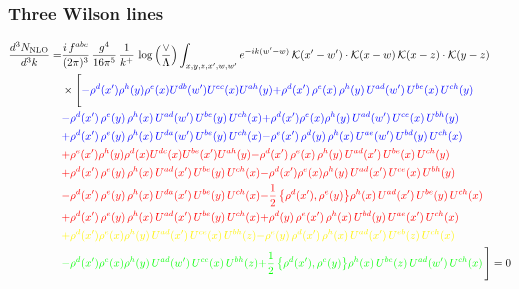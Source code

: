 \documentclass[9pt]{article}
\numberwithin{equation}{section}
\begin{document}
\subsubsection{Three Wilson lines}
\begin{align}
\frac{d^{3}N_{\rm NLO}}{d^{3}k}= &\frac{i\,f^{abc}}{(2\pi)^{3}}\,\frac{g^{4}}{16\pi^{5}}\,\frac{1}{k^{+}}\,\log\Big(\frac{\vee}{\Lambda}\Big)\int_{x,y,z,x',w,w'}e^{-ik(w'-w)}\,\mathcal{K}(x'-w')\cdot\mathcal{K}(x-w)\,\mathcal{K}(x-z)\cdot\mathcal{K}(y-z)\notag\\
&\times\Bigg[{\color{blue}-\rho^{d}(x') \rho^{h}(y) \rho^{e}(x) U^{d b}(w') U^{e c}(x) U^{a h}(y)} {\color{blue}+\rho^{d}(x')\,\rho^{e}(x)\,\rho^{h}(y)\,U^{ad}(w')\,U^{be}(x)\,U^{ch}(y)} \notag \\ &{\color{blue}-\rho^{d}(x')\,\rho^{e}(y)\,\rho^{h}(x)\,U^{ad}(w')\,U^{be}(y)\,U^{ch}(x)}{\color{blue}+\rho^{d}(x')\rho^{e}(x)\rho^{h}(y)\, U^{ad}(w')\,U^{ce}(x)\, U^{bh}(y)}\notag \\ &{\color{blue}+\rho^{d}(x')\, \rho^{e}(y)\,\rho^{h}(x)\, U^{da}(w')\,U^{be}(y)\,U^{ch}(x)}{\color{blue}-\rho^{e}(x')\,\rho^{d}(y)\,\rho^{h}(x)\,U^{ae}(w')\,U^{bd}(y)\,U^{ch}(x)}\notag \\ &{\color{red}+\rho^{e}(x') \rho^{h}(y) \rho^{d}(x) U^{d c}(x) U^{b e}(x') U^{a h}(y)}{\color{red}-\rho^{d}(x')\,\rho^{e}(x)\,\rho^{h}(y)\,U^{ad}(x')\,U^{be}(x)\,U^{ch}(y)}\notag \\ &{\color{red}+\rho^{d}(x')\,\rho^{e}(y)\,\rho^{h}(x)\,U^{ad}(x')\,U^{be}(y)\,U^{ch}(x)}{\color{red}-\rho^{d}(x')\rho^{e}(x)\rho^{h}(y)\, U^{ad}(x')\,U^{ce}(x)\, U^{bh}(y)}\notag \\ &{\color{red}-\rho^{d}(x')\, \rho^{e}(y)\,\rho^{h}(x)\, U^{da}(x')\,U^{be}(y)\,U^{ch}(x)}{\color{red}-\frac{1}{2}\,\big\{\rho^{d}(x'),\rho^{e}(y)\big\}\rho^{h}(x)\,U^{ad}(x')\,U^{be}(y)\,U^{ch}(x)}\notag \\ & {\color{red}+\rho^{d}(x')\,\rho^{e}(y)\,\rho^{h}(x)\,U^{ad}(x')\,U^{be}(y)\,U^{ch}(x)}{\color{red}+\rho^{d}(y)\,\rho^{e}(x')\,\rho^{h}(x)\,U^{bd}(y)\,U^{ae}(x')\,U^{ch}(x)}\notag \\ & {\color{yellow}+\rho^{d}(x')\rho^{e}(x)\rho^{h}(y)\, U^{ad}(x')\,U^{ce}(x)\, U^{bh}(z)}{\color{yellow}-\rho^{e}(y)\,\rho^{d}(x')\,\rho^{h}(x)\,U^{ad}(x')\,U^{eb}(z)\,U^{ch}(x)}\notag \\
&{\color{green}-\rho^{d}(x')\rho^{e}(x)\rho^{h}(y)\, U^{ad}(w')\,U^{ce}(x)\, U^{bh}(z)}{\color{green}+\frac{1}{2}\,\big\{\rho^{d}(x'),\rho^{e}(y)\big\}\rho^{h}(x)\,U ^{be}(z)\,U^{ad}(w')\,U^{ch}(x)}\,\Bigg] = 0 
\end{align}
\end{document}
